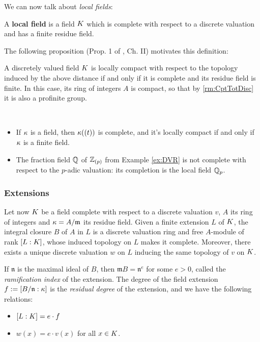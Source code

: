 \documentclass[a4paper, oneside]{memoir}
\begin{document}
We can now talk about \textit{local fields}:

\begin{definition}
    A \textbf{local field} is a field $K$ which is complete with respect to a discrete valuation and has a finite residue field.
\end{definition}

The following proposition (Prop. 1 of \cite{SerreCL}, Ch. II)
motivates this definition:
\begin{proposition}
    A discretely valued field $K$ is locally compact with respect to the topology induced by the above distance if and only if it is complete and its residue field is finite. In
    this case, its ring of integers $A$ is compact, so that by \ref{rm:CptTotDisc} it is also a profinite group.
\end{proposition}

\begin{example}\
    \begin{itemize}
        \item If $\kappa$ is a field, then $\kappa((t))$ is complete, and it's locally compact if and only if $\kappa$ is a finite field.
        \item The fraction field $\mathbb{Q}$ of $\mathbb{Z}_{(p)}$ from Example \ref{ex:DVR} is not complete with respect to the $p$-adic valuation: its completion is the local field $\mathbb{Q}_p$.
    \end{itemize}
\end{example}

\subsubsection{Extensions}

Let now $K$ be a field complete with respect to a discrete valuation $v$, $A$ its ring of integers and $\kappa=A/\mathfrak{m}$ its residue field. Given a finite extension $L$ of $K$, the integral closure $B$ of $A$ in $L$ is a discrete valuation ring and free $A$-module of rank $[L:K]$, whose induced
topology on $L$ makes it complete. Moreover, there exists a unique discrete valuation $w$ on $L$ inducing the same topology of $v$ on $K$.

If $\mathfrak{n}$ is the maximal ideal of $B$, then $\mathfrak{m}B=\mathfrak{n}^e$ for some $e>0$, called the
\textit{ramification index} of the extension. The degree of the field extension $f:=[B /\mathfrak{n}:\kappa]$
is the \textit{residual degree} of the extension, and we have the following relations:
\begin{itemize}
    \item \( [L:K]=e\cdot f \)
    \item $w(x) = e\cdot v(x)$ for all $x\in K$.
\end{itemize}
\end{document}
